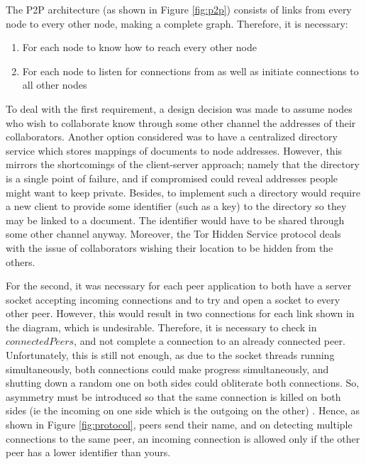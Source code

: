 \documentclass[diss.tex]{subfiles}
\begin{document}
The P2P architecture (as shown in Figure \ref{fig:p2p}) consists of links from every node to every other node, making a complete graph. Therefore, it is necessary:
\begin{enumerate}
	\item For each node to know how to reach every other node
	\item For each node to listen for connections from as well as initiate connections to all other nodes
\end{enumerate}
To deal with the first requirement, a design decision was made to assume nodes who wish to collaborate know through some other channel the addresses of their collaborators. Another option considered was to have a centralized directory service which stores mappings of documents to node addresses. However, this mirrors the shortcomings of the client-server approach; namely that the directory is a single point of failure, and if compromised could reveal addresses people might want to keep private. Besides, to implement such a directory would require a new client to provide some identifier (such as a key) to the directory so they may be linked to a document. The identifier would have to be shared through some other channel anyway. Moreover, the Tor Hidden Service protocol deals with the issue of collaborators wishing their location to be hidden from the others.

For the second, it was necessary for each peer application to both have a server socket accepting incoming connections and to try and open a socket to every other peer. However, this would result in two connections for each link shown in the diagram, which is undesirable. Therefore, it is necessary to check in $connectedPeers$, and not complete a connection to an already connected peer. Unfortunately, this is still not enough, as due to the socket threads running simultaneously, both connections could make progress simultaneously, and shutting down a random one on both sides could obliterate both connections. So, asymmetry must be introduced so that the same connection is killed on both sides (ie the incoming on one side which is the outgoing on the other) . Hence, as shown in Figure \ref{fig:protocol}, peers send their name, and on detecting multiple connections to the same peer, an incoming connection is allowed only if the other peer has a lower identifier than yours.
\end{document}
